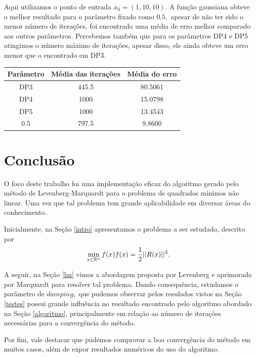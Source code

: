 \documentclass[12pt,a4paper]{article}
\newcounter{ex}[section]
\begin{document}
	
	Aqui utilizamos o ponto de entrada $x_0 = (1, 10, 10).$ A função gaussiana obteve o melhor resultado para o parâmetro fixado como $0.5,$ apesar de não ter sido o menor número de iterações, foi encontrado uma média de erro melhor comparado aos outros parâmetros. Percebemos também que para os parâmetros DP4 e DP5 atingimos o número máximo de iterações, apesar disso, ele ainda obteve um erro menor que o encontrado em DP3.
	
	\begin{table}[H]
		\centering
		\begin{tabular}{|c|c|c|}
			\hline
			Parâmetro & Média das iterações & Média do erro\\
			\hline
			
			DP3 & 445.5 & 80.5061\\ \hline
			DP4 & 1000 & 15.0798\\ \hline
			DP5 & 1000 & 13.4543\\ \hline
			0.5 & 797.5 & 9.8600\\		\hline	
			
		\end{tabular}
	\end{table}

	
	\section{Conclusão}
	
	O foco deste trabalho foi uma implementação eficaz do algoritmo gerado pelo método de Levenberg-Marquardt para o problema de quadrados mínimos não linear. Uma vez que tal problema tem grande aplicabilidade em diversar áreas do conhecimento. 
	
	Inicialmente, na Seção \ref{intro} apresentamos o problema a ser estudado, descrito por 
	\begin{equation*}
	\min_{x \in \mathbb{R}^{n}} f(x) 
	\\	
	f(x) = \frac{1}{2}||R(x)||^2.
	\end{equation*}
	
	A seguir, na Seção \ref{lm} vimos a abordagem proposta por Levenberg e aprimorada por Marquardt para resolver tal problema. Dando consequência, estudamos o parâmetro de $damping,$ que pudemos observar pelos resulados vistos na Seção \ref{testes} possui grande influência no resultado encontrado pelo algoritmo abordado na Seção \ref{algoritmo}, principalmente em relação ao número de iterações necessárias para a convergência do método.
	
	Por fim, vale destacar que pudemos comprovar a boa convergência do método em muitos casos, além de expor resultados numéricos do uso do algoritmo.
	
	
	\nocite{aes}
	\nocite{friedlander1994elementos}
	\nocite{kab}
	
	
	
\end{document}
